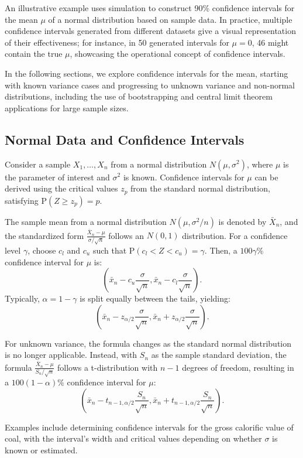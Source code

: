 \documentclass{article}
\begin{document}
An illustrative example uses simulation to construct 90\% confidence intervals for the mean $\mu$ of a normal distribution based on sample data. In practice, multiple confidence intervals generated from different datasets give a visual representation of their effectiveness; for instance, in 50 generated intervals for $\mu=0$, 46 might contain the true $\mu$, showcasing the operational concept of confidence intervals.

In the following sections, we explore confidence intervals for the mean, starting with known variance cases and progressing to unknown variance and non-normal distributions, including the use of bootstrapping and central limit theorem applications for large sample sizes.

\subsection{Normal Data and Confidence Intervals}

Consider a sample $X_{1}, \ldots, X_{n}$ from a normal distribution $N(\mu, \sigma^{2})$, where $\mu$ is the parameter of interest and $\sigma^{2}$ is known. Confidence intervals for $\mu$ can be derived using the critical values $z_{p}$ from the standard normal distribution, satisfying $\mathrm{P}(Z \geq z_{p})=p$.

The sample mean from a normal distribution $N(\mu, \sigma^{2}/n)$ is denoted by $\bar{X}_{n}$, and the standardized form $\frac{\bar{X}_{n}-\mu}{\sigma / \sqrt{n}}$ follows an $N(0,1)$ distribution. For a confidence level $\gamma$, choose $c_{l}$ and $c_{u}$ such that $\mathrm{P}(c_{l}<Z<c_{u})=\gamma$. Then, a $100 \gamma \%$ confidence interval for $\mu$ is:
\[
\left(\bar{x}_{n}-c_{u} \frac{\sigma}{\sqrt{n}}, \bar{x}_{n}-c_{l} \frac{\sigma}{\sqrt{n}}\right).
\]
Typically, $\alpha=1-\gamma$ is split equally between the tails, yielding:
\[
\left(\bar{x}_{n}-z_{\alpha / 2} \frac{\sigma}{\sqrt{n}}, \bar{x}_{n}+z_{\alpha / 2} \frac{\sigma}{\sqrt{n}}\right).
\]

For unknown variance, the formula changes as the standard normal distribution is no longer applicable. Instead, with $S_{n}$ as the sample standard deviation, the formula $\frac{\bar{X}_{n}-\mu}{S_{n} / \sqrt{n}}$ follows a t-distribution with $n-1$ degrees of freedom, resulting in a $100(1-\alpha)\%$ confidence interval for $\mu$:
\[
\left(\bar{x}_{n}-t_{n-1, \alpha / 2} \frac{S_{n}}{\sqrt{n}}, \bar{x}_{n}+t_{n-1, \alpha / 2} \frac{S_{n}}{\sqrt{n}}\right).
\]

Examples include determining confidence intervals for the gross calorific value of coal, with the interval's width and critical values depending on whether $\sigma$ is known or estimated.
\end{document}
